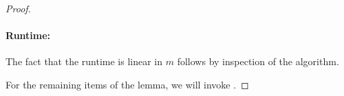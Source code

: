 \documentclass[11pt]{article}
\theoremstyle{plain}
\renewcommand{\cP}{\mathcal{P}}
\begin{document}
\begin{proof}
\paragraph{Runtime:} The fact that the runtime is linear in $m$ follows by inspection of the algorithm.

For the remaining items of the lemma, we will invoke .






\end{proof}
\end{document}
